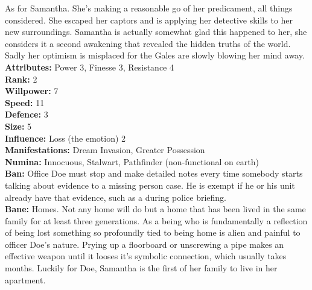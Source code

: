 As for Samantha. She's making a reasonable go of her predicament, all things considered. She escaped her captors and is applying her detective skills to her new surroundings. Samantha is actually somewhat glad this happened to her, she considers it a second awakening that revealed the hidden truths of the world. Sadly her optimism is misplaced for the Gales are slowly blowing her mind away. \\

\noindent \textbf{Attributes:} Power 3, Finesse 3, Resistance 4\\

\noindent \textbf{Rank:} 2\\

\noindent \textbf{Willpower:} 7\\

\noindent \textbf{Speed:} 11\\

\noindent \textbf{Defence:} 3\\

\noindent \textbf{Size:} 5 \\

\noindent \textbf{Influence:} Loss (the emotion) 2\\

\noindent \textbf{Manifestations:} Dream Invasion, Greater Possession\\

\noindent \textbf{Numina:} Innocuous, Stalwart, Pathfinder (non-functional on earth)\\

\noindent \textbf{Ban:} Office Doe must stop and make detailed notes every time somebody starts talking about evidence to a missing person case. He is exempt if he or his unit already have that evidence, such as a during police briefing. \\

\noindent \textbf{Bane:} Homes. Not any home will do but a home that has been lived in the same family for at least three generations. As a being who is fundamentally a reflection of being lost something so profoundly tied to being home is alien and painful to officer Doe's nature. Prying up a floorboard or unscrewing a pipe makes an effective weapon until it looses it's symbolic connection, which usually takes months. Luckily for Doe, Samantha is the first of her family to live in her apartment. 


\newpage{}


